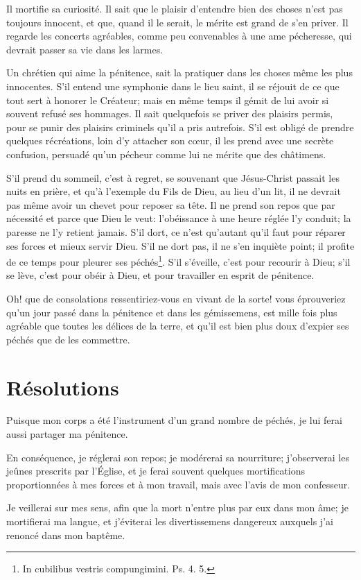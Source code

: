 \documentclass[instructions.tex]{subfiles}
\begin{document}
Il mortifie sa curiosité. Il sait que le plaisir d’entendre bien des choses n’est pas toujours innocent, et que, quand il le serait, le mérite est grand de s’en priver. Il regarde les concerts agréables, comme peu convenables à une ame pécheresse, qui devrait passer sa vie dans les larmes.
 
\tertio Un chrétien qui aime la pénitence, sait la pratiquer dans les choses même les plus innocentes. S’il entend une symphonie dans le lieu saint, il se réjouit de ce que tout sert à honorer le Créateur; mais en même temps il gémit de lui avoir si souvent refusé ses hommages. Il sait quelquefois se priver des plaisirs permis, pour se punir des plaisirs criminels qu’il a pris autrefois. S’il est obligé de prendre quelques récréations, loin d’y attacher son cœur, il les prend avec une secrète confusion, persuadé qu’un pécheur comme lui ne mérite que des châtimens.
 
S’il prend du sommeil, c’est à regret, se souvenant que Jésus-Christ passait les nuits en prière, et qu’à l’exemple du Fils de Dieu, au lieu d’un lit, il ne devrait pas même avoir un chevet pour reposer sa tête. Il ne prend son repos que par nécessité et parce que Dieu le veut: l’obéissance à une heure réglée l’y conduit; la paresse ne l’y retient jamais. S’il dort, ce n’est qu’autant qu’il faut pour réparer ses forces et mieux servir Dieu. S’il ne dort pas, il ne s’en inquiète point; il profite de ce temps pour pleurer ses péchés\footnote{In cubilibus vestris compungimini. Ps. 4. 5.}. S’il s’éveille, c’est pour recourir à Dieu; s’il se lève, c’est pour obéir à Dieu, et pour travailler en esprit de pénitence.
 
Oh! que de consolations ressentiriez-vous en vivant de la sorte! vous éprouveriez qu’un jour passé dans la pénitence et dans les gémissemens, est mille fois plus agréable que toutes les délices de la terre, et qu’il est bien plus doux d’expier ses péchés que de les commettre.
 
\section{Résolutions}
 
\primo Puisque mon corps a été l’instrument d’un grand nombre de péchés, je lui ferai aussi partager ma pénitence.

\secundo En conséquence, je réglerai son repos; je modérerai sa nourriture; j’observerai les jeûnes prescrits par l’Église, et je ferai souvent quelques mortifications proportionnées à mes forces et à mon travail, mais avec l’avis de mon confesseur.

\tertio Je veillerai sur mes sens, afin que la mort n’entre plus par eux dans mon âme; je mortifierai ma langue, et j’éviterai les divertissemens dangereux auxquels j’ai renoncé dans mon baptême.
 
 
\end{document}
